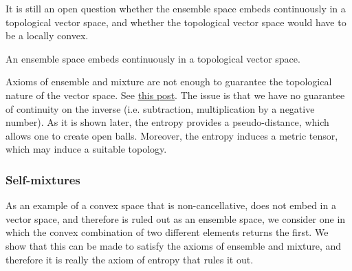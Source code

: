 It is still an open question whether the ensemble space embeds continuously in a topological vector space, and whether the topological vector space would have to be a locally convex.

\begin{mathSection}
\begin{conj}\label{pm_es_ensemblesAreTVS}
	An ensemble space embeds continuously in a topological vector space.
\end{conj}

\begin{remark}
	Axioms of ensemble and mixture are not enough to guarantee the topological nature of the vector space. See \href{https://math.stackexchange.com/questions/4921905/cancellative-convex-spaces-and-topological-vector-spaces}{this post}. The issue is that we have no guarantee of continuity on the inverse (i.e. subtraction, multiplication by a negative number). As it is shown later, the entropy provides a pseudo-distance, which allows one to create open balls. Moreover, the entropy induces a metric tensor, which may induce a suitable topology.
\end{remark}
\end{mathSection}

\subsubsection{Self-mixtures}

As an example of a convex space that is non-cancellative, does not embed in a vector space, and therefore is ruled out as an ensemble space, we consider one in which the convex combination of two different elements returns the first. We show that this can be made to satisfy the axioms of ensemble and mixture, and therefore it is really the axiom of entropy that rules it out.

